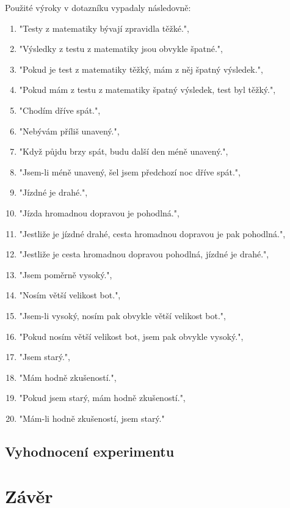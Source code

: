 Použité výroky v dotazníku vypadaly následovně:
\begin{enumerate}
       \item  "Testy z matematiky bývají zpravidla těžké.", 
       \item "Výsledky z testu z matematiky jsou obvykle špatné.",
       \item "Pokud je test z matematiky těžký, mám z něj špatný výsledek.",
       \item  "Pokud mám z testu z matematiky špatný výsledek, test byl těžký.",
       \item  "Chodím dříve spát.",
       \item  "Nebývám příliš unavený.",
       \item  "Když půjdu brzy spát, budu další den méně unavený.",
       \item  "Jsem-li méně unavený, šel jsem předchozí noc dříve spát.",
       \item  "Jízdné je drahé.",
       \item  "Jízda hromadnou dopravou je pohodlná.",
       \item  "Jestliže je jízdné drahé, cesta hromadnou dopravou je pak pohodlná.",
       \item  "Jestliže je cesta hromadnou dopravou pohodlná, jízdné je drahé.",
       \item  "Jsem poměrně vysoký.",
       \item  "Nosím větší velikost bot.",
       \item  "Jsem-li vysoký, nosím pak obvykle větší velikost bot.",
       \item  "Pokud nosím větší velikost bot, jsem pak obvykle vysoký.",
       \item  "Jsem starý.",
       \item  "Mám hodně zkušeností.",
       \item  "Pokud jsem starý, mám hodně zkušeností.",
       \item  "Mám-li hodně zkušeností, jsem starý."
\end{enumerate}
\section{Vyhodnocení experimentu}
\chapter{Závěr}